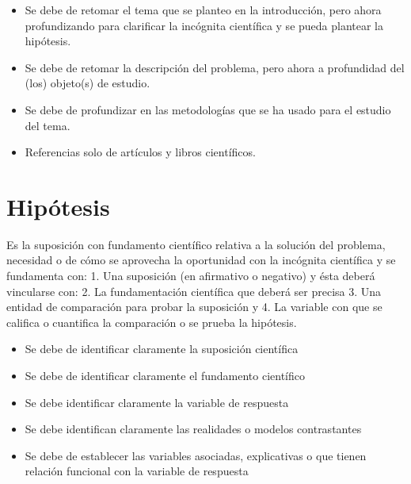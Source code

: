         \begin{itemize}
            \item Se debe de retomar el tema que se planteo en la introducción, pero ahora profundizando para clarificar la incógnita científica y se pueda plantear la hipótesis.
            \item Se debe de retomar la descripción del problema, pero ahora a profundidad del (los) objeto(s) de estudio. 
            \item Se debe de profundizar en las metodologías que se ha usado para el estudio del tema.
            \item Referencias solo de artículos y libros científicos.
        \end{itemize}
     

    
    
    \section{Hipótesis}
    
        Es la suposición con fundamento científico relativa a la solución del problema, necesidad o de cómo se aprovecha la oportunidad con la incógnita científica y se fundamenta con: 1. Una suposición (en afirmativo o negativo) y ésta deberá vincularse con:
        2. La fundamentación científica que deberá ser precisa 3. Una entidad de comparación para probar la suposición y
        4. La variable con que se califica o cuantifica la comparación o se prueba la hipótesis.
        
        \begin{itemize}
            \item Se debe de identificar claramente la suposición científica
            \item Se debe de identificar claramente el fundamento científico
            \item Se debe identificar claramente la variable de respuesta
            \item Se debe identifican claramente las realidades o modelos contrastantes
            \item Se debe de establecer las variables asociadas, explicativas o que tienen relación funcional con la variable de respuesta
        \end{itemize}
     

    
